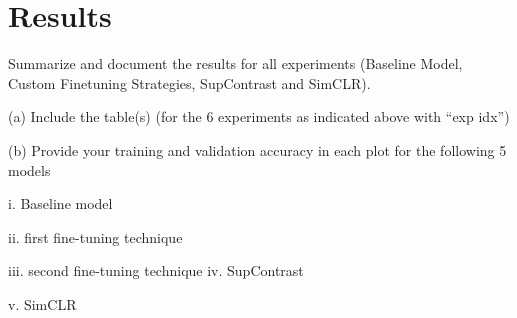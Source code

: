 \section*{Results}

Summarize and document the results for all experiments (Baseline Model, Custom Finetuning Strategies, SupContrast and SimCLR).

(a) Include the table(s) (for the 6 experiments as indicated above with “exp idx”)

(b) Provide your training and validation accuracy in each plot for the following 5 models

i. Baseline model

ii. first fine-tuning technique

iii. second fine-tuning technique iv. SupContrast

v. SimCLR
